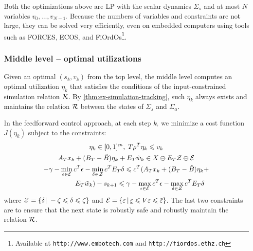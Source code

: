 Both the optimizations above are LP with the scalar dynamics $\Sigma_{s}$ and at most $N$ variables $v_{0},\dots,v_{N-1}$.
Because the numbers of variables and constraints are not large, they can be solved very efficiently, even on embedded computers using tools such as FORCES, ECOS, and FiOrdOs\footnote{Available at \texttt{http://www.embotech.com} and \texttt{http://fiordos.ethz.ch}}.


\subsubsection{Middle level -- optimal utilizations}

Given an optimal $(s_{k}, v_{k})$ from the top level, the middle level computes an optimal utilization $\eta_{k}$ that satisfies the conditions of the input-constrained simulation relation $\mathcal{R}$.
By \cref{thm:ex-simulation-tracking}, such $\eta_{k}$ always exists and maintains the relation $\mathcal{R}$ between the states of $\Sigma_{s}$ and $\Sigma_{a}$.

In the feedforward control approach, at each step $k$, we minimize a cost function $J(\eta_{k})$ subject to the constraints:
\begin{gather*}
  \eta_{k} \in [0,1]^{m}, \; T \rho^{T} \eta_{k} \leqslant v_{k} \\
  A_{T} x_{k} + (B_{T} - \tilde{B}) \eta_{k} + E_{T} \tilde{w}_{k} \in X \ominus E_{T} \mathcal{Z} \ominus \mathcal{E} \\
  -\gamma - \min_{\epsilon \in \mathcal{E}} c^{T} \epsilon - \min_{\delta \in \mathcal{Z}} c^{T} E_{T} \delta \leqslant c^{T}(A_{T} x_{k} + (B_{T} - \tilde{B}) \eta_{k} + \\ \qquad\qquad E_{T} \tilde{w}_{k}) - s_{k+1} \leqslant \gamma - \max_{\epsilon \in \mathcal{E}} c^{T} \epsilon - \max_{\delta \in \mathcal{Z}} c^{T} E_{T} \delta
\end{gather*}
where $\mathcal{Z} = \{ \delta \,|\, -\zeta \leqslant \delta \leqslant \zeta\}$ and $\ESet = \{\varepsilon \,|\, \underline{\varepsilon} \leqslant V \varepsilon \leqslant \overbar{\varepsilon}\}$.
The last two constraints are to ensure that the next state is robustly safe and robustly maintain the relation $\mathcal{R}$.



